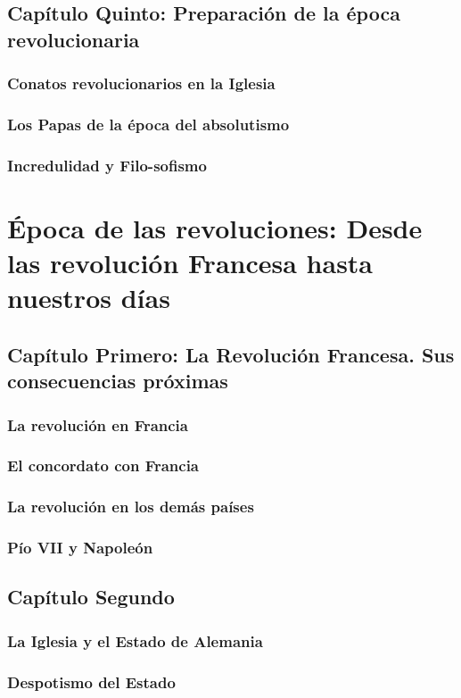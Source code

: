 \raggedbottom{} \documentclass[12pt, a4paper]{book}
\begin{document}
\chapter{Capítulo Quinto: Preparación de la época revolucionaria}
\section{Conatos revolucionarios en la Iglesia}
\section{Los Papas de la época del absolutismo}
\section{Incredulidad y Filo-sofismo}
\part{Época de las revoluciones: Desde las revolución Francesa hasta nuestros días}
\chapter{Capítulo Primero: La Revolución Francesa. Sus consecuencias próximas}
\section{La revolución en Francia}
\section{El concordato con Francia}
\section{La revolución en los demás países}
\section{Pío VII y Napoleón}
\chapter{Capítulo Segundo}
\section{La Iglesia y el Estado de Alemania}
\section{Despotismo del Estado}
\end{document}

